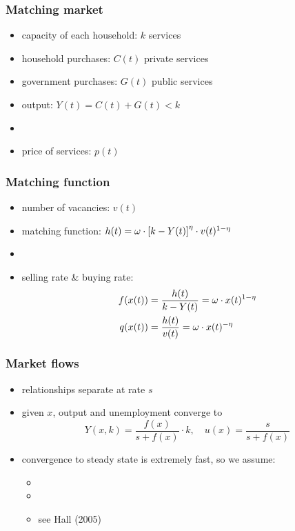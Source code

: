 \documentclass[12pt,xcolor={dvipsnames},hyperref={pdftex,pdfpagemode=UseNone,hidelinks,pdfdisplaydoctitle=true},usepdftitle=false]{beamer}
\begin{document}
\begin{frame}
\frametitle{Matching market}
\begin{itemize}
\item capacity of each household: $k$ services
\item household purchases: $C(t)$ private services
\item government purchases: $G(t)$ public services
\item output: $Y(t)=C(t)+G(t)<k$
\item {}
\item price of services: $p(t)$
\end{itemize}
\end{frame}

\begin{frame}
\frametitle{Matching function}
\begin{itemize}
\item number of vacancies: $v(t)$ 
\item matching function: $h(t)=\omega\cdot \left[ k-Y(t) \right]^{\eta}\cdot v(t)^{1-\eta}$
\item {}
\item selling rate \& buying rate: 
\begin{align*}
f(x(t))&=\frac{h(t)}{k-Y(t)} = \omega\cdot x(t)^{1-\eta}\\
q(x(t))&= \frac{h(t)}{v(t)}= \omega\cdot x(t)^{-\eta}
\end{align*}
\end{itemize}
\end{frame}

\begin{frame}
\frametitle{Market flows}
\begin{itemize}
\item relationships separate at rate $s$
\item given $x$, output and unemployment converge to
\begin{equation*}
Y(x,k) =\frac{f(x)}{s+f(x)}\cdot k,\quad u(x) =\frac{s}{s+f(x)}
\end{equation*}
\item convergence to steady state is extremely fast, so we assume:
\begin{itemize}
\item {}
\item {}
\item see Hall (2005)
\end{itemize}
\end{itemize}
\end{frame}
\end{document}
